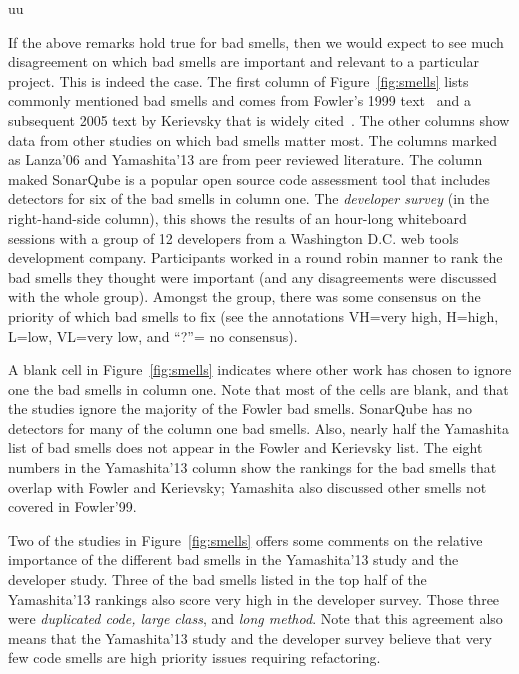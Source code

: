 uu \documentclass[final,twocolumn,5p]{elsarticle}
\newcommand{\fig}[1]{Figure~\ref{fig:#1}}
\theoremstyle{break}
\begin{document}
If the above remarks hold true for bad smells, then we would expect
to see much disagreement on which bad smells are important and relevant
to  a particular project. This is indeed the case.
The first column of \fig{smells} 
lists  commonly mentioned bad smells and comes from Fowler's 1999 text~\cite{fowler99} and a subsequent 2005 text by Kerievsky that is widely cited~\cite{Kerievsky2005}.
The other
columns show data from other studies on which bad smells matter most.
The columns marked as Lanza'06 and Yamashita'13 are from peer reviewed literature. The column maked SonarQube is a popular open source
code assessment tool that includes detectors for six of the bad smells
in column one. 
The {\em developer survey}   (in the right-hand-side column),
  this shows the results of an hour-long whiteboard sessions with a group of 12 developers from a Washington
    D.C. web tools development company. Participants
    worked in a round robin manner to rank the bad smells they thought were
    important (and any disagreements were discussed with the whole group).
     Amongst the group, there was  some
    consensus on  the priority of which bad smells to fix
    (see the annotations VH=very high,
    H=high, L=low, VL=very low, and ``?''= no consensus).  
   
   
   


A  blank cell in \fig{smells}
indicates where   other work has chosen to ignore
one the   bad smells in column one. 
Note that most of the cells are blank, and that the studies ignore the majority of the Fowler bad smells.
SonarQube has no detectors for many of the column one bad smells.
Also, nearly half the Yamashita list of bad smells
    does not appear in the Fowler and Kerievsky list. The eight numbers
    in the  Yamashita'13 column show the rankings for the bad smells 
    that overlap with Fowler and Kerievsky; Yamashita also discussed other smells not covered in Fowler'99.
    

Two of the studies in \fig{smells} offers some comments on the relative importance
of the different bad smells in the Yamashita'13 study and the developer study. Three of the bad smells listed in the top half of the Yamashita'13 rankings also score very high in the developer survey. Those three were {\em duplicated code, large class}, 
        and {\em long method}. 
 Note that this agreement also means that the
  Yamashita'13 study and the developer survey   
  believe
        that very few  code smells are   high priority issues
        requiring refactoring. 
        
\end{document}
